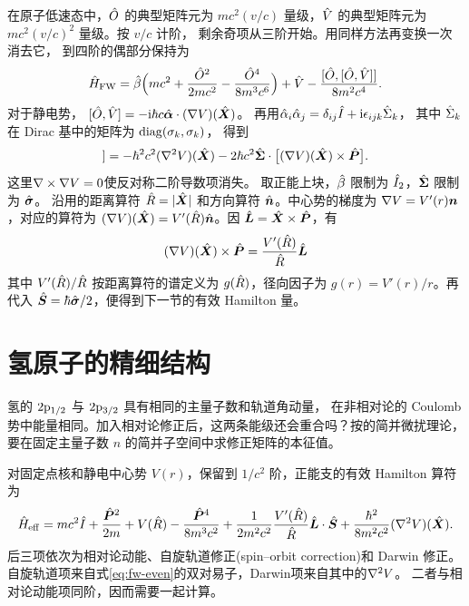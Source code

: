 在原子低速态中，$\hat{O}$ 的典型矩阵元为 $mc^2(v/c)$ 量级，$\hat{V}$ 的典型矩阵元为 $mc^2(v/c)^2$ 量级。按 $v/c$ 计阶，
剩余奇项从三阶开始。用同样方法再变换一次消去它，
到四阶的偶部分保持为\cite{littlejohnfw}
\begin{equation}
    \hat{H}_{\mathrm{FW}}
    = \hat{\beta}\Bigl(mc^2 + \frac{\hat{O}^2}{2mc^2}
        - \frac{\hat{O}^4}{8m^3c^6}\Bigr)
    + \hat{V} - \frac{[\hat{O},[\hat{O},\hat{V}]]}{8m^2c^4}.
    \label{eq:fw-even}
\end{equation}
对于静电势，
$[\hat{O},\hat{V}] = -\mathrm{i}\hbar c\hat{\bm{\alpha}} \cdot (\nabla V)(\hat{\bm{X}})$。
再用$\hat{\alpha}_i\hat{\alpha}_j = \delta_{ij}\hat{I} + \mathrm{i}\epsilon_{ijk}\hat{\Sigma}_k$，
其中 $\hat{\Sigma}_k$ 在 Dirac 基中的矩阵为 $\operatorname{diag}(\sigma_k,\sigma_k)$，
得到
\begin{equation}
    [\op{O},[\op{O},\op{V}]]
    = -\hbar^2c^2(\laplacian V)(\opbm{X})
    - 2\hbar c^2\opbm{\Sigma} \cdot \bigb{(\grad V)(\opbm{X}) \times \opbm{P}}.
\end{equation}
这里$\nabla\times\nabla V = 0$使反对称二阶导数项消失。
取正能上块，$\hat{\beta}$ 限制为 $\hat{I}_2$，$\hat{\bm{\Sigma}}$ 限制为 $\hat{\bm{\sigma}}$。
沿用的距离算符 $\hat{R} = \lvert\hat{\bm{X}}\rvert$ 和方向算符 $\hat{\bm{n}}$。中心势的梯度为 $\nabla V = V'(r)\bm n$，对应的算符为 $(\nabla V)(\hat{\bm{X}}) = V'(\hat{R})\hat{\bm{n}}$。因 $\hat{\bm{L}} = \hat{\bm{X}} \times \hat{\bm{P}}$，有
\[
    (\nabla V)(\hat{\bm{X}}) \times \hat{\bm{P}}
        = \frac{V'(\hat{R})}{\hat{R}}\hat{\bm{L}}
\]
其中 $V'(\hat{R})/\hat{R}$ 按距离算符的谱定义为 $g(\hat{R})$，径向因子为 $g(r) = V'(r)/r$。再代入 $\hat{\bm{S}} = \hbar\hat{\bm{\sigma}}/2$，便得到下一节的有效 Hamilton 量。

\section{氢原子的精细结构}
氢的 $2\mathrm{p}_{1/2}$ 与 $2\mathrm{p}_{3/2}$ 具有相同的主量子数和轨道角动量，
在非相对论的 Coulomb 势中能量相同。加入相对论修正后，这两条能级还会重合吗？按的简并微扰理论，要在固定主量子数 $n$ 的简并子空间中求修正矩阵的本征值。

对固定点核和静电中心势 $V(r)$，保留到 $1/c^2$ 阶，正能支的有效 Hamilton 算符为
\begin{equation}
    \hat{H}_{\mathrm{eff}} = mc^2\hat{I} + \frac{\hat{\bm{P}}^2}{2m} + V(\hat{R})
            - \frac{\hat{\bm{P}}^4}{8m^3c^2}
            + \frac{1}{2m^2c^2}\frac{V'(\hat{R})}{\hat{R}}\hat{\bm{L}} \cdot \hat{\bm{S}}
            + \frac{\hbar^2}{8m^2c^2}(\nabla^2 V)(\hat{\bm{X}}).
    \label{eq:paulicorrections}
\end{equation}
后三项依次为相对论动能、自旋轨道修正(spin--orbit correction)和 Darwin 修正。
自旋轨道项来自式\eqref{eq:fw-even}的双对易子，Darwin项来自其中的$\nabla^2 V$。
二者与相对论动能项同阶，因而需要一起计算\cite{mitfine}。

